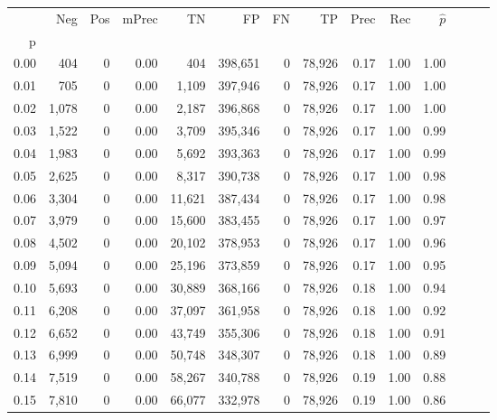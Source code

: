 \begin{tabular}{rrrrrrrrrrrrrr}
\toprule
{} &    Neg &    Pos & mPrec &       TN &       FP &      FN &      TP &  Prec &   Rec & $\hat{p}$ \\
p    &        &        &       &          &          &         &         &       &       &           \\
\midrule
0.00 &    404 &      0 &  0.00 &      404 &  398,651 &       0 &  78,926 &  0.17 &  1.00 &      1.00 \\
0.01 &    705 &      0 &  0.00 &    1,109 &  397,946 &       0 &  78,926 &  0.17 &  1.00 &      1.00 \\
0.02 &  1,078 &      0 &  0.00 &    2,187 &  396,868 &       0 &  78,926 &  0.17 &  1.00 &      1.00 \\
0.03 &  1,522 &      0 &  0.00 &    3,709 &  395,346 &       0 &  78,926 &  0.17 &  1.00 &      0.99 \\
0.04 &  1,983 &      0 &  0.00 &    5,692 &  393,363 &       0 &  78,926 &  0.17 &  1.00 &      0.99 \\
0.05 &  2,625 &      0 &  0.00 &    8,317 &  390,738 &       0 &  78,926 &  0.17 &  1.00 &      0.98 \\
0.06 &  3,304 &      0 &  0.00 &   11,621 &  387,434 &       0 &  78,926 &  0.17 &  1.00 &      0.98 \\
0.07 &  3,979 &      0 &  0.00 &   15,600 &  383,455 &       0 &  78,926 &  0.17 &  1.00 &      0.97 \\
0.08 &  4,502 &      0 &  0.00 &   20,102 &  378,953 &       0 &  78,926 &  0.17 &  1.00 &      0.96 \\
0.09 &  5,094 &      0 &  0.00 &   25,196 &  373,859 &       0 &  78,926 &  0.17 &  1.00 &      0.95 \\
0.10 &  5,693 &      0 &  0.00 &   30,889 &  368,166 &       0 &  78,926 &  0.18 &  1.00 &      0.94 \\
0.11 &  6,208 &      0 &  0.00 &   37,097 &  361,958 &       0 &  78,926 &  0.18 &  1.00 &      0.92 \\
0.12 &  6,652 &      0 &  0.00 &   43,749 &  355,306 &       0 &  78,926 &  0.18 &  1.00 &      0.91 \\
0.13 &  6,999 &      0 &  0.00 &   50,748 &  348,307 &       0 &  78,926 &  0.18 &  1.00 &      0.89 \\
0.14 &  7,519 &      0 &  0.00 &   58,267 &  340,788 &       0 &  78,926 &  0.19 &  1.00 &      0.88 \\
0.15 &  7,810 &      0 &  0.00 &   66,077 &  332,978 &       0 &  78,926 &  0.19 &  1.00 &      0.86 \\

\end{tabular}
